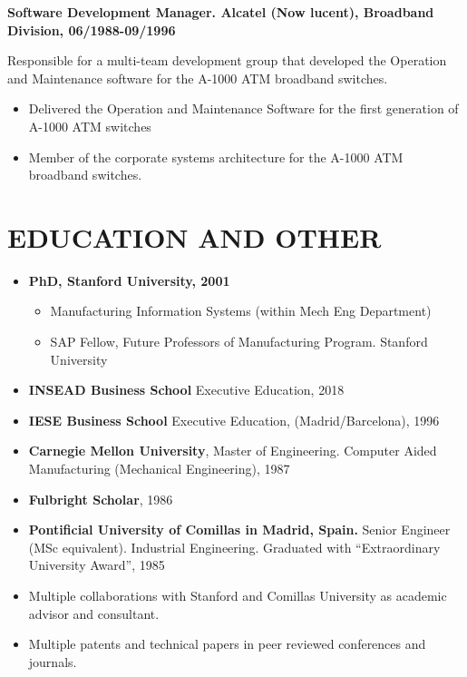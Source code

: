 \documentclass{res}
\begin{document}
\begin{resume}
{\bf Software Development Manager. Alcatel (Now lucent), Broadband Division, 06/1988-09/1996}

Responsible for a multi-team development group that developed the Operation and Maintenance software for the A-1000 ATM broadband switches.
\begin{itemize}
    \item Delivered the Operation and Maintenance Software for the first generation of A-1000 ATM switches
    \item Member of the corporate systems architecture for the A-1000 ATM broadband switches.
\end{itemize}


\section{EDUCATION AND OTHER}

    
\begin{itemize}
    \item {\bf PhD, Stanford University, 2001}
    \begin{itemize}
        \item Manufacturing Information Systems (within Mech Eng Department)
        \item SAP Fellow, Future Professors of Manufacturing Program. Stanford University
    \end{itemize}
    \item {\bf INSEAD Business School} Executive Education, 2018
    \item {\bf IESE Business School} Executive Education, (Madrid/Barcelona), 1996
    \item {\bf Carnegie Mellon University}, Master of Engineering. Computer Aided Manufacturing (Mechanical Engineering), 1987
    \item {\bf Fulbright Scholar}, 1986
    \item {\bf Pontificial University of Comillas in Madrid, Spain.} Senior Engineer (MSc equivalent). Industrial Engineering. Graduated with “Extraordinary University Award”, 1985
    \item Multiple collaborations with Stanford and Comillas University as academic advisor and consultant.
    \item Multiple patents and technical papers in peer reviewed conferences and journals.
\end{itemize}


\end{resume}
\end{document}
